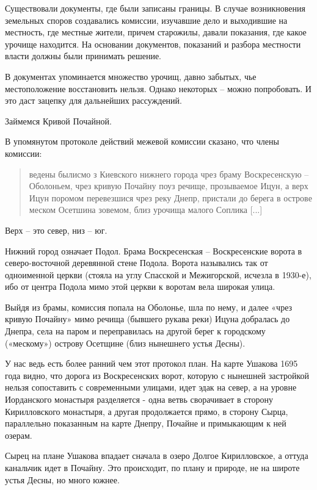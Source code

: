 Существовали документы, где были записаны границы. В случае возникновения земельных споров создавались комиссии, изучавшие дело и выходившие на местность, где местные жители, причем старожилы, давали показания, где какое урочище находится. На основании документов, показаний и разбора местности власти должны были принимать решение.

В документах упоминается множество урочищ, давно забытых, чье местоположение восстановить нельзя. Однако некоторых – можно попробовать. И это даст зацепку для дальнейших рассуждений.

Займемся Кривой Почайной.

В упомянутом протоколе действий межевой комиссии сказано, что члены комиссии:

\begin{quotation}
ведены былисмо з Киевского нижнего города чрез браму Воскресенскую – Оболоньем, чрез кривую Почайну поуз речище, прозываемое Ицун, а верх Ицун поромом перевезшися чрез реку Днепр, пристали до берега в острове меском Осетшина зовемом, близ урочища малого Соплика [...]
\end{quotation}

Верх – это север, низ – юг.

Нижний город означает Подол. Брама Воскресенская – Воскресенские ворота в северо-восточной деревянной стене Подола. Ворота назывались так от одноименной церкви (стояла на углу Спасской и Межигорской, исчезла в 1930-е), ибо от центра Подола мимо этой церкви к воротам вела широкая улица.

Выйдя из брамы, комиссия попала на Оболонье, шла по нему, и далее «чрез кривую Почайну»   мимо речища (бывшего рукава реки) Ицуна добралась до Днепра, села на паром и переправилась на другой берег к городскому («мескому») острову Осетщине (близ нынешнего устья Десны).

У нас ведь есть более ранний чем этот протокол план. На карте Ушакова 1695 года видно, что дорога из Воскресенских ворот, которую с нынешней застройкой нельзя сопоставить с современными улицами, идет эдак на север, а на уровне Иорданского монастыря разделяется - одна ветвь сворачивает в сторону Кирилловского монастыря, а другая продолжается прямо, в сторону Сырца, параллельно показанным на карте Днепру, Почайне и примыкающим к ней озерам.

Сырец на плане Ушакова впадает сначала в озеро Долгое Кирилловское, а оттуда канальчик идет в Почайну. Это происходит, по плану и природе, не на широте устья Десны, но много южнее.

